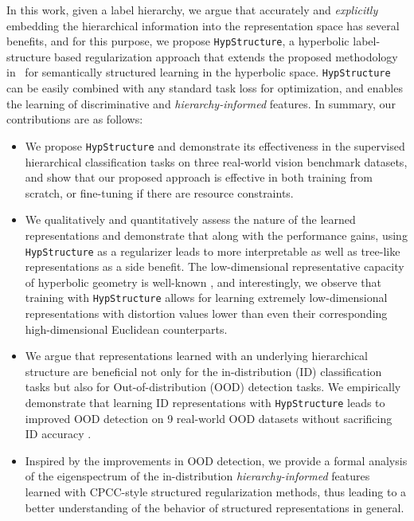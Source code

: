In this work, given a label hierarchy, we argue that accurately and \emph{explicitly} embedding the hierarchical information into the representation space has several benefits, and for this purpose, we propose \texttt{HypStructure}, a hyperbolic label-structure based regularization approach that extends the proposed methodology in~\citet{zeng2022learning} for semantically structured learning in the hyperbolic space. \texttt{HypStructure}
can be easily combined with any standard task loss for optimization, and enables the learning of discriminative and \emph{hierarchy-informed} features. In summary, our contributions are as follows:
\begin{itemize}
    \item We propose \texttt{HypStructure} and demonstrate its effectiveness in the supervised hierarchical classification tasks on three real-world vision benchmark datasets, and show that our proposed approach is effective in both training from scratch, or fine-tuning if there are resource constraints.
    \item We qualitatively and quantitatively assess the nature of the learned representations and demonstrate that along with the performance gains, using \texttt{HypStructure} as a regularizer leads to more interpretable as well as tree-like representations as a side benefit. The low-dimensional representative capacity of hyperbolic geometry is well-known \citep{chami2020low}, and interestingly, we observe that training with \texttt{HypStructure} allows for learning extremely low-dimensional representations with distortion values lower than even their corresponding high-dimensional Euclidean counterparts.
    \item We argue that representations learned with an underlying hierarchical structure are beneficial not only for the in-distribution (ID) classification tasks but also for Out-of-distribution (OOD) detection tasks. We empirically demonstrate that learning ID representations with \texttt{HypStructure} leads to improved OOD detection on 9 real-world OOD datasets without sacrificing ID accuracy \citep{zhang2023openood}. 
    \item Inspired by the improvements in OOD detection, we provide a formal analysis of the eigenspectrum of the in-distribution \emph{hierarchy-informed} features learned with CPCC-style structured regularization methods, thus leading to a better understanding of the behavior of structured representations in general. 
\end{itemize}